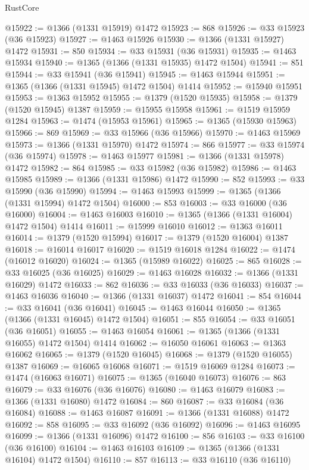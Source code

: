 \begin{lexlean}{RustCore}
\begin{coremodule}
@15922 := @1366 (@1331 @15919) @1472
@15923 := 868
@15926 := @33 @15923 (@36 @15923)
@15927 := @1463 @15926
@15930 := @1366 (@1331 @15927) @1472
@15931 := 850
@15934 := @33 @15931 (@36 @15931)
@15935 := @1463 @15934
@15940 := @1365 (@1366 (@1331 @15935) @1472 @1504)
@15941 := 851
@15944 := @33 @15941 (@36 @15941)
@15945 := @1463 @15944
@15951 := @1365 (@1366 (@1331 @15945) @1472 @1504) @1414
@15952 := @15940 @15951
@15953 := @1363 @15952
@15955 := @1379 (@1520 @15935)
@15958 := @1379 (@1520 @15945) @1387
@15959 := @15955 @15958
@15961 := @1519 @15959 @1284
@15963 := @1474 (@15953 @15961)
@15965 := @1365 (@15930 @15963)
@15966 := 869
@15969 := @33 @15966 (@36 @15966)
@15970 := @1463 @15969
@15973 := @1366 (@1331 @15970) @1472
@15974 := 866
@15977 := @33 @15974 (@36 @15974)
@15978 := @1463 @15977
@15981 := @1366 (@1331 @15978) @1472
@15982 := 864
@15985 := @33 @15982 (@36 @15982)
@15986 := @1463 @15985
@15989 := @1366 (@1331 @15986) @1472
@15990 := 852
@15993 := @33 @15990 (@36 @15990)
@15994 := @1463 @15993
@15999 := @1365 (@1366 (@1331 @15994) @1472 @1504)
@16000 := 853
@16003 := @33 @16000 (@36 @16000)
@16004 := @1463 @16003
@16010 := @1365 (@1366 (@1331 @16004) @1472 @1504) @1414
@16011 := @15999 @16010
@16012 := @1363 @16011
@16014 := @1379 (@1520 @15994)
@16017 := @1379 (@1520 @16004) @1387
@16018 := @16014 @16017
@16020 := @1519 @16018 @1284
@16022 := @1474 (@16012 @16020)
@16024 := @1365 (@15989 @16022)
@16025 := 865
@16028 := @33 @16025 (@36 @16025)
@16029 := @1463 @16028
@16032 := @1366 (@1331 @16029) @1472
@16033 := 862
@16036 := @33 @16033 (@36 @16033)
@16037 := @1463 @16036
@16040 := @1366 (@1331 @16037) @1472
@16041 := 854
@16044 := @33 @16041 (@36 @16041)
@16045 := @1463 @16044
@16050 := @1365 (@1366 (@1331 @16045) @1472 @1504)
@16051 := 855
@16054 := @33 @16051 (@36 @16051)
@16055 := @1463 @16054
@16061 := @1365 (@1366 (@1331 @16055) @1472 @1504) @1414
@16062 := @16050 @16061
@16063 := @1363 @16062
@16065 := @1379 (@1520 @16045)
@16068 := @1379 (@1520 @16055) @1387
@16069 := @16065 @16068
@16071 := @1519 @16069 @1284
@16073 := @1474 (@16063 @16071)
@16075 := @1365 (@16040 @16073)
@16076 := 863
@16079 := @33 @16076 (@36 @16076)
@16080 := @1463 @16079
@16083 := @1366 (@1331 @16080) @1472
@16084 := 860
@16087 := @33 @16084 (@36 @16084)
@16088 := @1463 @16087
@16091 := @1366 (@1331 @16088) @1472
@16092 := 858
@16095 := @33 @16092 (@36 @16092)
@16096 := @1463 @16095
@16099 := @1366 (@1331 @16096) @1472
@16100 := 856
@16103 := @33 @16100 (@36 @16100)
@16104 := @1463 @16103
@16109 := @1365 (@1366 (@1331 @16104) @1472 @1504)
@16110 := 857
@16113 := @33 @16110 (@36 @16110)

\end{coremodule}
\end{lexlean}
